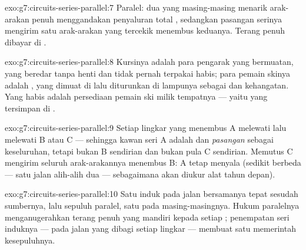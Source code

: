 \begin{solution}{exo:g7:circuits-series-parallel:7}
Paralel: dua  yang masing-masing menarik arak-arakan penuh
menggandakan penyaluran total , sedangkan pasangan serinya
mengirim satu arak-arakan yang tercekik menembus keduanya. Terang
penuh dibayar di .
\end{solution}

\begin{solution}{exo:g7:circuits-series-parallel:8}
Kursinya adalah para pengarak yang bermuatan, yang beredar tanpa henti
dan tidak pernah terpakai habis; para pemain skinya adalah ,
yang dimuat di  lalu diturunkan di lampunya sebagai 
dan kehangatan. Yang habis adalah persediaan pemain ski milik
tempatnya --- yaitu  yang tersimpan di .
\end{solution}

\begin{solution}{exo:g7:circuits-series-parallel:9}
Setiap lingkar yang menembus A melewati  lalu melewati B
atau C --- sehingga kawan seri A adalah  dan \emph{pasangan}
 sebagai keseluruhan, tetapi bukan B sendirian dan bukan pula
C sendirian. Memutus  C mengirim seluruh arak-arakannya menembus
B: A tetap menyala (sedikit berbeda --- satu jalan alih-alih dua ---
sebagaimana akan diukur alat tahun depan).
\end{solution}

\begin{solution}{exo:g7:circuits-series-parallel:10}
Satu  induk pada jalan bersamanya tepat sesudah sumbernya, lalu
sepuluh  paralel, satu  pada masing-masingnya. Hukum
paralelnya menganugerahkan terang penuh yang mandiri kepada setiap
; penempatan seri induknya --- pada jalan yang dibagi setiap
lingkar --- membuat satu  memerintah kesepuluhnya.
\end{solution}

